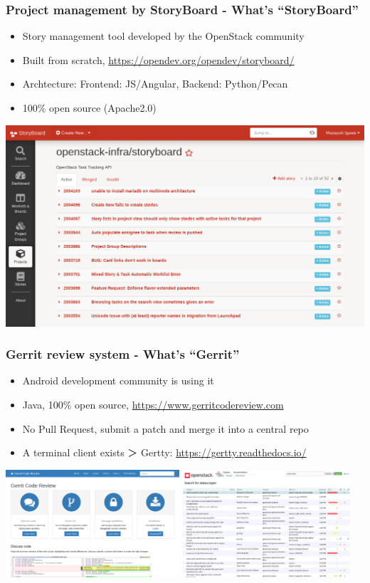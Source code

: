\documentclass[aspectratio=169,11pt,hyperref={colorlinks=true}]{beamer}
\begin{document}
\begin{frame}
  \frametitle{Project management by StoryBoard - What's ``StoryBoard''}
  \begin{itemize}
    \item Story management tool developed by the OpenStack community
    \item Built from scratch, \url{https://opendev.org/opendev/storyboard/}
    \item Archtecture: {Frontend: JS/Angular, Backend: Python/Pecan}
    \item 100\% open source (Apache2.0)
  \end{itemize}
  \centering\includegraphics[scale=0.2]{images/storyboard.png}
\end{frame}

\begin{frame}
  \frametitle{Gerrit review system - What's ``Gerrit''}
  \begin{itemize}
    \item Android development community is using it
    \item Java, 100\% open source, \url{https://www.gerritcodereview.com}
    \item No Pull Request, submit a patch and merge it into a central repo
    \item A terminal client exists ＞ Gertty: \url{https://gertty.readthedocs.io/}
  \end{itemize}
  \centering
  \includegraphics[height=40mm]{images/gerritcodereview-com.png}
  \includegraphics[height=40mm]{images/review-openstack-org.png}
\end{frame}
\end{document}
